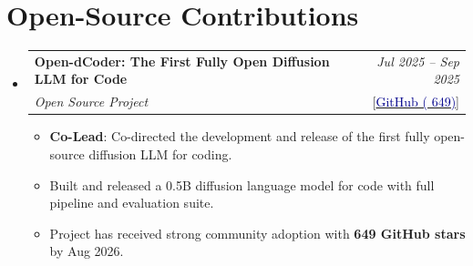 \documentclass[a4paper,11pt]{article}
\makeatletter
\newcommand{\resumeProject}[4]{
\vspace{0.5mm}\item
    \begin{tabular*}{0.98\textwidth}[t]{l@{\extracolsep{\fill}}r}
        \textbf{#1} & \textit{\footnotesize{#3}} \\
        \footnotesize{\textit{#2}} & \footnotesize{#4}
    \end{tabular*}
    \vspace{-2.4mm}
}
\newcommand{\resumeSubHeadingListStart}{\begin{itemize}[leftmargin=*,labelsep=1mm]}
\newcommand{\resumeItemListStart}{\begin{itemize}[leftmargin=*,labelsep=1mm,itemsep=0.5mm]}
\newcommand{\resumeSubHeadingListEnd}{\end{itemize}\vspace{2mm}}
\newcommand{\resumeItemListEnd}{\end{itemize}\vspace{-2mm}}
\makeatother
\begin{document}
\section{\textbf{Open-Source Contributions}}
\vspace{-0.5mm}
\resumeSubHeadingListStart

\resumeProject
  {Open-dCoder: The First Fully Open Diffusion LLM for Code}
  {Open Source Project}
  {Jul 2025 -- Sep 2025}
  {{[\href{https://github.com/pengzhangzhi/Open-dLLM}{\textcolor{darkblue}{GitHub (\faStar{} 649)}}] \; [\href{https://oval-shell-31c.notion.site/Open-dLLM-Open-Diffusion-Large-Language-Model-25e03bf6136480b7a4ebe3d53be9f68a}{\textcolor{darkblue}{Project Page}}]}}
\resumeItemListStart
  \item \textbf{Co-Lead}: Co-directed the development and release of the first fully open-source diffusion LLM for coding.
  \item Built and released a 0.5B diffusion language model for code with full pipeline and evaluation suite.
  \item Project has received strong community adoption with \textbf{649 GitHub stars} by Aug 2026.
\resumeItemListEnd
\resumeSubHeadingListEnd


\end{document}
